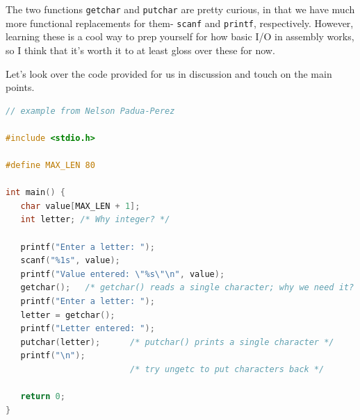 \documentclass[english, 10pt]{article}
\begin{document}
The two functions \texttt{getchar} and \texttt{putchar} are pretty curious, in that we have much more functional replacements for them- \texttt{scanf} and \texttt{printf}, respectively. However, learning these is a cool way to prep yourself for how basic I/O in assembly works, so I think that it's worth it to at least gloss over these for now. \newline

Let's look over the code provided for us in discussion and touch on the main points.

\begin{lstlisting}[language=C]
// example from Nelson Padua-Perez

#include <stdio.h>                                                                    
                                                                                      
#define MAX_LEN 80                                                                    
                                                                                      
int main() {                                                                          
   char value[MAX_LEN + 1];                                                           
   int letter; /* Why integer? */                                                     
                                                                                      
   printf("Enter a letter: ");                                                        
   scanf("%1s", value);                                                               
   printf("Value entered: \"%s\"\n", value);                                          
   getchar();   /* getchar() reads a single character; why we need it? */             
   printf("Enter a letter: ");                                                        
   letter = getchar();                                                                
   printf("Letter entered: ");                                                        
   putchar(letter);      /* putchar() prints a single character */                    
   printf("\n");                                                                      
                         /* try ungetc to put characters back */                      
                                                                                      
   return 0;                                                                          
}  
\end{lstlisting}
\end{document}
